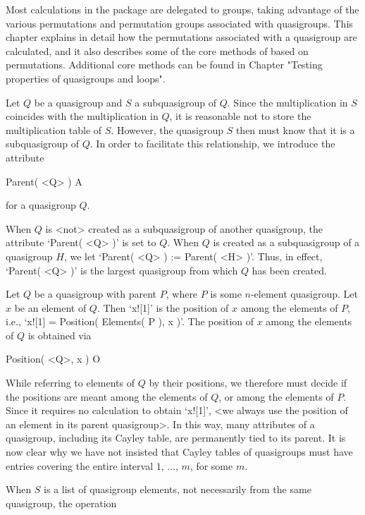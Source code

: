 
Most calculations in the {\LOOPS} package are delegated to groups, taking
advantage of the various permutations and permutation groups associated with
quasigroups. This chapter explains in detail how the permutations associated
with a quasigroup are calculated, and it also describes some of the core
methods of {\LOOPS} based on permutations. Additional core methods can be found
in Chapter "Testing properties of quasigroups and loops".


Let $Q$ be a quasigroup and $S$ a subquasigroup of $Q$. Since the
multiplication in $S$ coincides with the multiplication in $Q$, it is
reasonable not to store the multiplication table of $S$. However, the
quasigroup $S$ then must know that it is a subquasigroup of $Q$. In order to
facilitate this relationship, we introduce the attribute

\>Parent( <Q> ) A

for a quasigroup $Q$.

When $Q$ is <not> created as a subquasigroup of another quasigroup, the
attribute `Parent( <Q> )' is set to $Q$. When $Q$ is created as a subquasigroup
of a quasigroup $H$, we let `Parent( <Q> ) := Parent( <H> )'. Thus, in effect,
`Parent( <Q> )' is the largest quasigroup from which $Q$ has been created.

Let $Q$ be a quasigroup with parent $P$, where $P$ is some $n$-element
quasigroup. Let $x$ be an element of $Q$. Then `x![1]' is the position of $x$
among the elements of $P$, i.e., `x![1] = Position( Elements( P ), x )'. The
position of $x$ among the elements of $Q$ is obtained via

\>Position( <Q>, x ) O

While referring to elements of $Q$ by their positions, we therefore must decide
if the positions are meant among the elements of $Q$, or among the elements of
$P$. Since it requires no calculation to obtain `x![1]', <we always use the
position of an element in its parent quasigroup>. In this way, many attributes
of a quasigroup, including its Cayley table, are permanently tied to its
parent. It is now clear why we have not insisted that Cayley tables of
quasigroups must have entries covering the entire interval $1$, $\dots$, $m$,
for some $m$.

When $S$ is a list of quasigroup elements, not necessarily from the same
quasigroup, the operation

